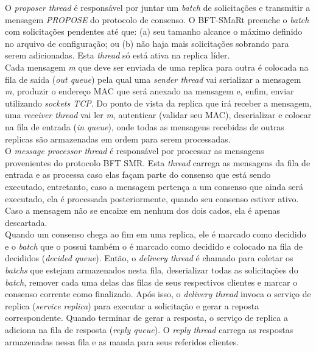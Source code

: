 	O \textit{proposer thread} é responsável por juntar um \textit{batch} de solicitações e transmitir a mensagem \textit{PROPOSE} do protocolo de consenso. O BFT-SMaRt preenche o \textit{batch} com solicitações pendentes até que: (a) seu tamanho alcance o máximo definido no arquivo de configuração; ou (b) não haja mais solicitações sobrando para serem adicionadas. Esta \textit{thread} só está ativa na replica líder. \\
	
	Cada mensagem \textit{m} que deve ser enviada de uma replica para outra é colocada na fila de saída (\textit{out queue}) pela qual uma \textit{sender thread} vai serializar a mensagem \textit{m}, produzir o endereço MAC que será anexado na mensagem e, enfim, enviar utilizando \textit{sockets TCP}. Do ponto de vista da replica que irá receber a mensagem, uma \textit{receiver thread} vai ler \textit{m}, autenticar (validar seu MAC), deserializar e colocar na fila de entrada (\textit{in queue}), onde todas as mensagens recebidas de outras replicas são armazenadas em ordem para serem processadas.  \\
	
	O \textit{message processor thread} é responsável por processar as mensagens provenientes do protocolo BFT SMR. Esta \textit{thread} carrega as mensagens da fila de entrada e as processa caso elas façam parte do consenso que está sendo executado, entretanto, caso a mensagem pertença a um consenso que ainda será executado, ela é processada posteriormente, quando seu consenso estiver ativo. Caso a mensagem não se encaixe em nenhum dos dois cados, ela é apenas descartada. \\
	
	 Quando um consenso chega ao fim em uma replica, ele é marcado como decidido e o \textit{batch} que o possui também o é marcado como decidido e colocado na fila de decididos (\textit{decided queue}). Então, o \textit{delivery thread} é chamado para coletar os \textit{batchs} que estejam armazenados nesta fila, deserializar todas as solicitações do \textit{batch}, remover cada uma delas das filas de seus respectivos clientes e marcar o  consenso corrente como finalizado. Após isso, o \textit{delivery thread} invoca o serviço de replica (\textit{service replica}) para executar a solicitação e gerar a reposta correspondente. Quando terminar de gerar a resposta, o serviço de replica a adiciona na fila de resposta (\textit{reply queue}). O \textit{reply thread} carrega as respostas armazenadas nessa fila e as manda para seus referidos clientes. \\
	 
